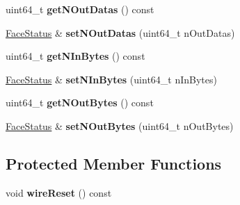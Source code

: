 \begin{DoxyCompactItemize}
\item 
uint64\+\_\+t {\bfseries get\+N\+Out\+Datas} () const\hypertarget{classndn_1_1nfd_1_1FaceStatus_a150afbe8f8327aedd8e54695caf17abc}{}\label{classndn_1_1nfd_1_1FaceStatus_a150afbe8f8327aedd8e54695caf17abc}

\item 
\hyperlink{classndn_1_1nfd_1_1FaceStatus}{Face\+Status} \& {\bfseries set\+N\+Out\+Datas} (uint64\+\_\+t n\+Out\+Datas)\hypertarget{classndn_1_1nfd_1_1FaceStatus_a219293b713c6dfe4760a95acc4f8e1ee}{}\label{classndn_1_1nfd_1_1FaceStatus_a219293b713c6dfe4760a95acc4f8e1ee}

\item 
uint64\+\_\+t {\bfseries get\+N\+In\+Bytes} () const\hypertarget{classndn_1_1nfd_1_1FaceStatus_a6b98bc95253952e0f1699e31bff8756c}{}\label{classndn_1_1nfd_1_1FaceStatus_a6b98bc95253952e0f1699e31bff8756c}

\item 
\hyperlink{classndn_1_1nfd_1_1FaceStatus}{Face\+Status} \& {\bfseries set\+N\+In\+Bytes} (uint64\+\_\+t n\+In\+Bytes)\hypertarget{classndn_1_1nfd_1_1FaceStatus_ac0430bfff47e59715e25d8bf687872fd}{}\label{classndn_1_1nfd_1_1FaceStatus_ac0430bfff47e59715e25d8bf687872fd}

\item 
uint64\+\_\+t {\bfseries get\+N\+Out\+Bytes} () const\hypertarget{classndn_1_1nfd_1_1FaceStatus_ae33de2674a449b2ff80560324935fe6e}{}\label{classndn_1_1nfd_1_1FaceStatus_ae33de2674a449b2ff80560324935fe6e}

\item 
\hyperlink{classndn_1_1nfd_1_1FaceStatus}{Face\+Status} \& {\bfseries set\+N\+Out\+Bytes} (uint64\+\_\+t n\+Out\+Bytes)\hypertarget{classndn_1_1nfd_1_1FaceStatus_a569cd353bc5e9a0be30f0c06eb6ac1a6}{}\label{classndn_1_1nfd_1_1FaceStatus_a569cd353bc5e9a0be30f0c06eb6ac1a6}

\end{DoxyCompactItemize}
\subsection*{Protected Member Functions}
\begin{DoxyCompactItemize}
\item 
void {\bfseries wire\+Reset} () const\hypertarget{classndn_1_1nfd_1_1FaceStatus_ac30276d3bf1681790ae0a2f5698e4265}{}\label{classndn_1_1nfd_1_1FaceStatus_ac30276d3bf1681790ae0a2f5698e4265}

\end{DoxyCompactItemize}
